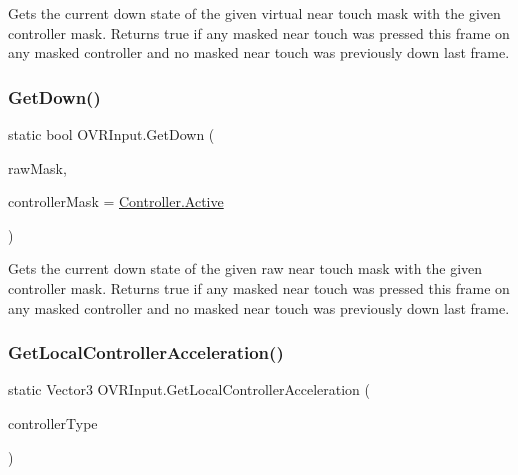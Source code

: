 Gets the current down state of the given virtual near touch mask with the given controller mask. Returns true if any masked near touch was pressed this frame on any masked controller and no masked near touch was previously down last frame. 

\mbox{\label{class_o_v_r_input_adb67773105cb3dbda71635d14b0963d5}} 
\subsubsection{\texorpdfstring{Get\+Down()}{GetDown()}\hspace{0.1cm}{\footnotesize\ttfamily [6/6]}}
{\footnotesize\ttfamily static bool O\+V\+R\+Input.\+Get\+Down (\begin{DoxyParamCaption}\item[{\mbox{\hyperlink{class_o_v_r_input_ac9c3c10aa9911507c6dc66e2dd6ec60e}{Raw\+Near\+Touch}}}]{raw\+Mask,  }\item[{\mbox{\hyperlink{class_o_v_r_input_a5c86f9052a9cbb0b73779ff5704d60a8}{Controller}}}]{controller\+Mask = {\ttfamily \mbox{\hyperlink{class_o_v_r_input_a5c86f9052a9cbb0b73779ff5704d60a8a4d3d769b812b6faa6b76e1a8abaece2d}{Controller.\+Active}}} }\end{DoxyParamCaption})\hspace{0.3cm}{\ttfamily [static]}}



Gets the current down state of the given raw near touch mask with the given controller mask. Returns true if any masked near touch was pressed this frame on any masked controller and no masked near touch was previously down last frame. 

\mbox{\label{class_o_v_r_input_a3d20bf824d737b85497fab8442638864}} 
\subsubsection{\texorpdfstring{Get\+Local\+Controller\+Acceleration()}{GetLocalControllerAcceleration()}}
{\footnotesize\ttfamily static Vector3 O\+V\+R\+Input.\+Get\+Local\+Controller\+Acceleration (\begin{DoxyParamCaption}\item[{\mbox{\hyperlink{class_o_v_r_input_a5c86f9052a9cbb0b73779ff5704d60a8}{O\+V\+R\+Input.\+Controller}}}]{controller\+Type }\end{DoxyParamCaption})\hspace{0.3cm}{\ttfamily [static]}}



